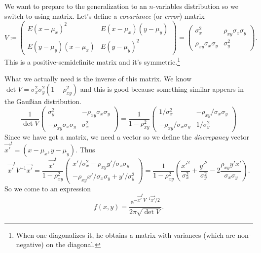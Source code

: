 \documentclass[
	10pt,
	draft
]{scrreprt}
\newcommand{\eu}{\ensuremath{\mathrm{e}}}
\begin{document}
We want to prepare to the generalization to an $n$-variables distribution so we switch to using matrix.
Let's define a \emph{covariance} (or \emph{error}) matrix
\begin{equation}
V\coloneqq 
\begin{pmatrix}
E(x-\mu_x)^2	&E(x-\mu_x)(y-\mu_y)\\
E(y-\mu_y)(x-\mu_x) & E(y-\mu_y)^2
\end{pmatrix}
=
\begin{pmatrix}
\sigma_x^2	&\rho_{xy}\sigma_x\sigma_y\\
\rho_{xy}\sigma_x\sigma_y &\sigma_y^2
\end{pmatrix}.
\end{equation}
This is a positive-semidefinite matrix and it's symmetric.\footnote{When one diagonalizes it, he obtains a matrix with variances (which are non-negative) on the diagonal.}

What we actually need is the inverse of this matrix.
We know $\det V  = \sigma_x^2\sigma_y^2(1-\rho_{xy }^2)$ and this is good because something similar appears in the Gau\ss{}ian distribution.
\begin{equation}
\frac{1}{\det V}
\begin{pmatrix}
\sigma_y^2	&-\rho_{xy}\sigma_x\sigma_y\\
-\rho_{xy}\sigma_x\sigma_y &\sigma_x^2
\end{pmatrix}
=
\frac{1}{1-\rho_{xy}^2}
\begin{pmatrix}
1/\sigma_x^2	&-\rho_{xy}/\sigma_x\sigma_y\\
-\rho_{xy}/\sigma_x\sigma_y &1/\sigma_y^2
\end{pmatrix}
\end{equation}
Since we have got a matrix, we need a vector so we define the \emph{discrepancy} vector $\vec{x'}^t = (x-\mu_x,y-\mu_y)$.
Thus
\begin{equation}
\vec{x'}^tV^{-1}\vec{x'} = 
\frac{\vec{x'}^t}{1-\rho_{xy}^2}
\begin{pmatrix}
x'/\sigma_x^2-\rho_{xy}y'/\sigma_x\sigma_y\\
-\rho_{xy}x'/\sigma_x\sigma_y + y'/\sigma_y^2
\end{pmatrix}
=
\frac{1}{1-\rho_{xy}^2}
\left(
\frac{x'^2}{\sigma_x^2} + \frac{y'^2}{\sigma_y^2} - 2 \frac{\rho_{xy}y'x'}{\sigma_x\sigma_y}
\right).
\end{equation}
So we come to an expression
\begin{equation}
f(x,y) = \frac{\eu^{-\vec{x'}^tV^{-1}\vec{x'}\!/2}}{2\pi\sqrt{\det V}}.
\end{equation}
\end{document}
